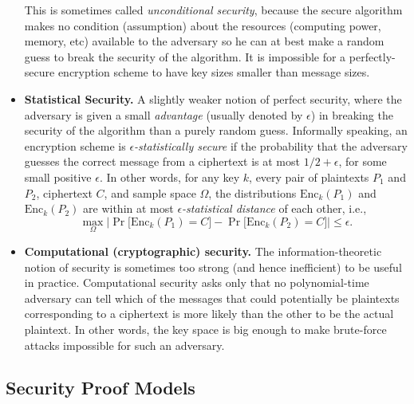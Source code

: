 \documentclass[10pt]{article}
\theoremstyle{plain}
\begin{document}
\begin{itemize}
	This is sometimes called \emph{unconditional security}, because the
	secure algorithm makes no condition (assumption) about the resources
	(computing power, memory, etc) available to the adversary so he can
	at best make a random guess to break the security of the algorithm.
	It is impossible for a perfectly-secure encryption scheme to have
	key sizes smaller than message sizes.
	\item \textbf{Statistical Security.} A slightly weaker notion of perfect
	security, where the adversary is given a small \emph{advantage} (usually
	denoted by $\epsilon$) in breaking the security of the algorithm
	than a purely random guess. Informally speaking, an encryption scheme
	is \emph{$\epsilon$-statistically secure} if the probability that
	the adversary guesses the correct message from a ciphertext is at
	most $1/2+\epsilon$, for some small positive $\epsilon$. In other
	words, for any key $k$, every pair of plaintexts $P_{1}$ and $P_{2}$,
	ciphertext $C$, and sample space $\Omega$, the distributions $\text{Enc}_{k}(P_{1})$
	and $\text{Enc}_{k}(P_{2})$ are within at most \emph{$\epsilon$-statistical
		distance} of each other, i.e., 
	\[
	\max_{\Omega}\Big|\Pr\big[\text{Enc}_{k}(P_{1})=C\big]-\Pr\big[\text{Enc}_{k}(P_{2})=C\big]\Big|\leq\epsilon.
	\]
	\item \textbf{Computational (cryptographic) security.} The information-theoretic
	notion of security is sometimes too strong (and hence inefficient)
	to be useful in practice. Computational security asks only that no
	polynomial-time adversary can tell which of the messages that could
	potentially be plaintexts corresponding to a ciphertext is more likely
	than the other to be the actual plaintext. In other words, the key
	space is big enough to make brute-force attacks impossible for such
	an adversary. 
\end{itemize}

\subsection{Security Proof Models}
\end{document}
